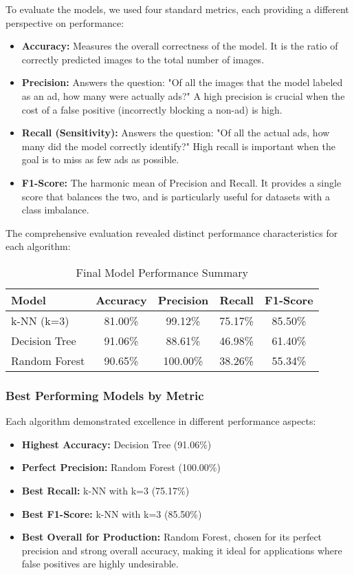 To evaluate the models, we used four standard metrics, each providing a different perspective on performance:
\begin{itemize}
    \item \textbf{Accuracy:} Measures the overall correctness of the model. It is the ratio of correctly predicted images to the total number of images.
    \item \textbf{Precision:} Answers the question: "Of all the images that the model labeled as an ad, how many were actually ads?" A high precision is crucial when the cost of a false positive (incorrectly blocking a non-ad) is high.
    \item \textbf{Recall (Sensitivity):} Answers the question: "Of all the actual ads, how many did the model correctly identify?" High recall is important when the goal is to miss as few ads as possible.
    \item \textbf{F1-Score:} The harmonic mean of Precision and Recall. It provides a single score that balances the two, and is particularly useful for datasets with a class imbalance.
\end{itemize}

The comprehensive evaluation revealed distinct performance characteristics for each algorithm:

\begin{table}[h]
\centering
\caption{Final Model Performance Summary}
\label{tab:final_performance}
\begin{tabular}{|l|c|c|c|c|}
\hline
\textbf{Model} & \textbf{Accuracy} & \textbf{Precision} & \textbf{Recall} & \textbf{F1-Score} \\
\hline
k-NN (k=3) & 81.00\% & 99.12\% & 75.17\% & 85.50\% \\
Decision Tree & 91.06\% & 88.61\% & 46.98\% & 61.40\% \\
Random Forest & 90.65\% & 100.00\% & 38.26\% & 55.34\% \\
\hline
\end{tabular}
\end{table}

\subsubsection{Best Performing Models by Metric}

Each algorithm demonstrated excellence in different performance aspects:

\begin{itemize}
    \item \textbf{Highest Accuracy:} Decision Tree (91.06\%)
    \item \textbf{Perfect Precision:} Random Forest (100.00\%)
    \item \textbf{Best Recall:} k-NN with k=3 (75.17\%)
    \item \textbf{Best F1-Score:} k-NN with k=3 (85.50\%)
    \item \textbf{Best Overall for Production:} Random Forest, chosen for its perfect precision and strong overall accuracy, making it ideal for applications where false positives are highly undesirable.
\end{itemize}

